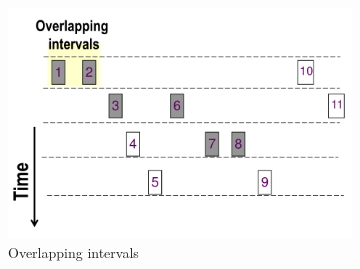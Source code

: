 \begin{figure}[H]
\begin{subfigure}[b]{0.2\textwidth}
        \caption{}
   		\label{fig:alu}
    \end{subfigure}
    \quad\quad\quad
    \begin{subfigure}[b]{0.45\textwidth}
        \includegraphics[width=\textwidth]{./Cap5/Images/Image07.png}
        \caption{Overlapping intervals}
   		\label{fig:Overlapping intervals}
    \end{subfigure}
    \caption{}
\end{figure}

